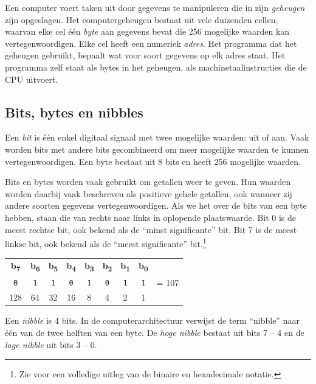 Een computer voert taken uit door gegevens te manipuleren die in zijn {\em geheugen} zijn opgeslagen. Het computergeheugen bestaat uit vele duizenden cellen, waarvan elke cel één {\em byte} aan gegevens bevat die 256 mogelijke waarden kan vertegenwoordigen. Elke cel heeft een numeriek {\em adres}. Het programma dat het geheugen gebruikt, bepaalt wat voor soort gegevens op elk adres staat. Het programma zelf staat als bytes in het geheugen, als machinetaalinstructies die de CPU uitvoert.

\subsection{Bits, bytes en nibbles}

Een {\em bit} is één enkel digitaal signaal met twee mogelijke waarden: uit of aan. Vaak worden bits met andere bits gecombineerd om meer mogelijke waarden te kunnen vertegenwoordigen. Een byte bestaat uit 8 bits en heeft 256 mogelijke waarden.

Bits en bytes worden vaak gebruikt om getallen weer te geven. Hun waarden worden daarbij vaak beschreven als positieve gehele getallen, ook wanneer zij andere soorten gegevens vertegenwoordigen. Als we het over de bits van een byte hebben, staan die van rechts naar links in oplopende plaatswaarde. Bit 0 is de meest rechtse bit, ook bekend als de ``minst significante'' bit. Bit 7 is de meest linkse bit, ook bekend als de ``meest significante'' bit.\footnote{Zie  voor een volledige uitleg van de binaire en hexadecimale notatie.}

\begin{center}
\begin{tabular}{ccccccccl}
{\bf b\textsubscript{7}} &{\bf b\textsubscript{6}} &{\bf b\textsubscript{5}} &{\bf b\textsubscript{4}} &{\bf b\textsubscript{3}} &{\bf b\textsubscript{2}} &{\bf b\textsubscript{1}} &{\bf b\textsubscript{0}} & \\\huge\texttt{0} &\huge\texttt{1} &\huge\texttt{1} &\huge\texttt{0} &\huge\texttt{1} &\huge\texttt{0} &\huge\texttt{1} &\huge\texttt{1} & = 107 \\\small{}128 &\small{}64 &\small{}32 &\small{}16 &\small{}8 &\small{}4 &\small{}2 &\small{}1 & \\
\end{tabular}
\end{center}

Een {\em nibble} is 4 bits. In de computerarchitectuur verwijst de term ``nibble'' naar één van de twee helften van een byte. De {\em hoge nibble} bestaat uit bits 7 -- 4 en de {\em lage nibble} uit bits 3 -- 0.

